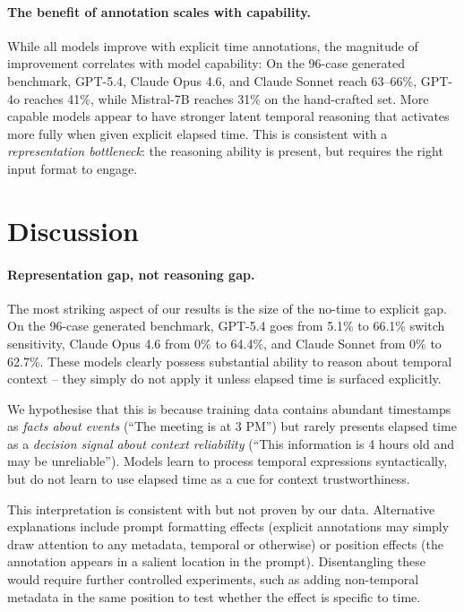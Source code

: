 \documentclass[11pt,a4paper]{article}
\begin{document}
\paragraph{The benefit of annotation scales with capability.}
While all models improve with explicit time annotations, the magnitude of improvement correlates with model capability: On the 96-case generated benchmark, GPT-5.4, Claude Opus 4.6, and Claude Sonnet reach 63--66\%, GPT-4o reaches 41\%, while Mistral-7B reaches 31\% on the hand-crafted set.
More capable models appear to have stronger latent temporal reasoning that activates more fully when given explicit elapsed time.
This is consistent with a \emph{representation bottleneck}: the reasoning ability is present, but requires the right input format to engage.

\section{Discussion}
\label{sec:discussion}

\paragraph{Representation gap, not reasoning gap.}
The most striking aspect of our results is the size of the no-time to explicit gap.
On the 96-case generated benchmark, GPT-5.4 goes from 5.1\% to 66.1\% switch sensitivity, Claude Opus 4.6 from 0\% to 64.4\%, and Claude Sonnet from 0\% to 62.7\%.
These models clearly possess substantial ability to reason about temporal context -- they simply do not apply it unless elapsed time is surfaced explicitly.

We hypothesise that this is because training data contains abundant timestamps as \emph{facts about events} (``The meeting is at 3 PM'') but rarely presents elapsed time as a \emph{decision signal about context reliability} (``This information is 4 hours old and may be unreliable'').
Models learn to process temporal expressions syntactically, but do not learn to use elapsed time as a cue for context trustworthiness.

This interpretation is consistent with but not proven by our data.
Alternative explanations include prompt formatting effects (explicit annotations may simply draw attention to any metadata, temporal or otherwise) or position effects (the annotation appears in a salient location in the prompt).
Disentangling these would require further controlled experiments, such as adding non-temporal metadata in the same position to test whether the effect is specific to time.
\end{document}
